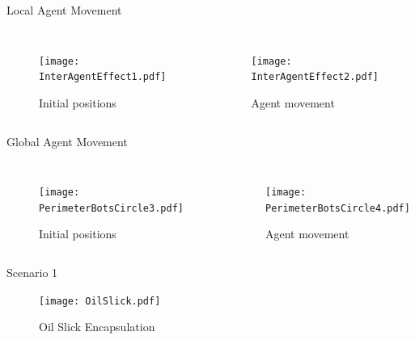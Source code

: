 \documentclass{beamer}
\begin{document}
\begin{frame}{Local Agent Movement}
  \begin{columns}
      \begin{figure}
        \begin{center}
          \texttt{[image: InterAgentEffect1.pdf]}
        \end{center}
        \caption{Initial positions}
      \end{figure}
        \begin{figure}
          \begin{center}
            \texttt{[image: InterAgentEffect2.pdf]}
          \end{center}
          \caption{Agent movement}
        \end{figure}
    \end{columns}
\end{frame}

\begin{frame}{Global Agent Movement}
  \begin{columns}
      \begin{figure}
        \begin{center}
          \texttt{[image: PerimeterBotsCircle3.pdf]}
        \end{center}
        \caption{Initial positions}
      \end{figure}
        \begin{figure}
          \begin{center}
            \texttt{[image: PerimeterBotsCircle4.pdf]}
          \end{center}
          \caption{Agent movement}
        \end{figure}
    \end{columns}
\end{frame}  

\begin{frame}{Scenario 1}
  \begin{center}
    \begin{figure}
      \begin{center}
        \texttt{[image: OilSlick.pdf]}
      \end{center}
      \caption{Oil Slick Encapsulation}
    \end{figure}
  \end{center}
\end{frame}  
\end{document}
